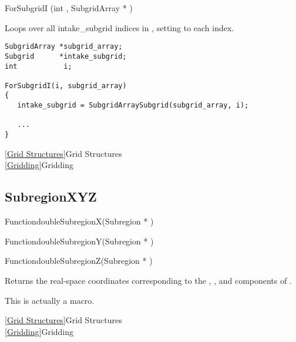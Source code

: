 \begin{defmac} ForSubgridI (int , {SubgridArray *} )

\DESCRIPTION
Loops over all intake_subgrid indices in , setting
 to each index.

\EXAMPLE
\mbox{}
\begin{display}\begin{verbatim}
SubgridArray *subgrid_array;
Subgrid      *intake_subgrid;
int           i;

ForSubgridI(i, subgrid_array)
{
   intake_subgrid = SubgridArraySubgrid(subgrid_array, i);

   ...
}
\end{verbatim}\end{display}

\SEEALSO
\vref{Grid Structures}{Grid Structures}\\
\vref{Gridding}{Gridding}

\end{defmac}


\newpage
\subsection{SubregionXYZ}
\label{SubregionXYZ}


\begin{deftypefn}{Function}{double}{SubregionX}({Subregion *} )
\end{deftypefn}
\begin{deftypefn}{Function}{double}{SubregionY}({Subregion *} )
\end{deftypefn}
\begin{deftypefn}{Function}{double}{SubregionZ}({Subregion *} )

\DESCRIPTION
Returns the real-space coordinates corresponding to the
, , and  components of .

\NOTES
This is actually a macro.

\SEEALSO
\vref{Grid Structures}{Grid Structures}\\
\vref{Gridding}{Gridding}

\end{deftypefn}

